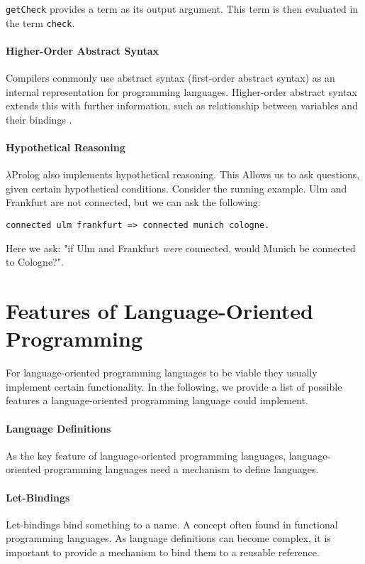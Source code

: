 \lstinline{getCheck} provides a term as its output argument. This term is then evaluated in the term \lstinline{check}.

\paragraph{Higher-Order Abstract Syntax}
Compilers commonly use abstract syntax (first-order abstract syntax) as an internal representation for programming languages. Higher-order abstract syntax extends this with further information, such as relationship between variables and their bindings \cite{pfenning_higher-order_1988}.


\paragraph{Hypothetical Reasoning}
$\lambda$Prolog also implements hypothetical reasoning. This Allows us to ask questions, given certain hypothetical conditions. Consider the running example. Ulm and Frankfurt are not connected, but we can ask the following:

\begin{lstlisting}
connected ulm frankfurt => connected munich cologne.
\end{lstlisting}

Here we ask: "if Ulm and Frankfurt \emph{were} connected, would Munich be connected to Cologne?".

\section{Features of Language-Oriented Programming}
\label{features-of-language-oriented-programming}

For language-oriented programming languages to be viable they usually implement certain functionality. In the following, we provide a list of possible features a language-oriented programming language could implement.

\paragraph{Language Definitions}
As the key feature of language-oriented programming languages, language-oriented programming languages need a mechanism to define languages.

\paragraph{Let-Bindings}
Let-bindings bind something to a name. A concept often found in functional programming languages. As language definitions can become complex, it is important to provide a mechanism to bind them to a reusable reference.

